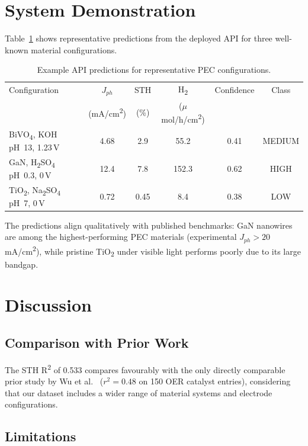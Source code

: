 \section{System Demonstration}

Table~\ref{tab:demo} shows representative predictions from the deployed API for
three well-known material configurations.

\begin{table}[h]
\centering
\caption{Example API predictions for representative PEC configurations.}
\label{tab:demo}
\begin{tabular}{p{3.2cm}ccccc}
\toprule
Configuration & $J_{ph}$ & STH & H\textsubscript{2} & Confidence & Class \\
              & (mA/cm\textsuperscript{2}) & (\%) & ($\mu$mol/h/cm\textsuperscript{2}) & & \\
\midrule
BiVO\textsubscript{4}, KOH pH~13, 1.23\,V & 4.68 & 2.9 & 55.2 & 0.41 & MEDIUM \\
GaN, H\textsubscript{2}SO\textsubscript{4} pH~0.3, 0\,V & 12.4 & 7.8 & 152.3 & 0.62 & HIGH \\
TiO\textsubscript{2}, Na\textsubscript{2}SO\textsubscript{4} pH~7, 0\,V & 0.72 & 0.45 & 8.4 & 0.38 & LOW \\
\bottomrule
\end{tabular}
\end{table}

The predictions align qualitatively with published benchmarks:
GaN nanowires are among the highest-performing PEC materials (experimental
$J_{ph} > 20$\,mA/cm\textsuperscript{2}), while pristine TiO\textsubscript{2}
under visible light performs poorly due to its large bandgap.

\section{Discussion}

\subsection{Comparison with Prior Work}

The STH R\textsuperscript{2} of 0.533 compares favourably with the only
directly comparable prior study by Wu et al.\ \cite{wu2019machine} ($r^2 = 0.48$
on 150 OER catalyst entries), considering that our dataset includes a wider
range of material systems and electrode configurations.

\subsection{Limitations}

